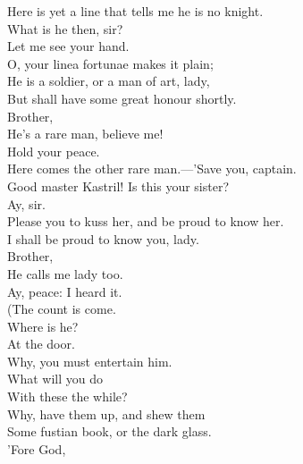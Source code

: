 \documentclass[a4paper,oneside,12pt]{memoir}
\begin{document}
\begin{drama*}
Here is yet a line that tells me he is no knight.\\
\pliantspeaks What is he then, sir?\\
\subtlespeaks {} Let me see your hand.\\
O, your linea fortunae makes it plain;\\
He is a soldier, or a man of art, lady,\\
But shall have some great honour shortly.\\
\pliantspeaks {} Brother,\\
He's a rare man, believe me!\\
\kastrilspeaks {} Hold your peace.\\
Here comes the other rare man.---'Save you, captain.\\
\facespeaks Good master Kastril! Is this your sister?\\
\kastrilspeaks {} Ay, sir.\\
Please you to kuss her, and be proud to know her.\\
\facespeaks I shall be proud to know you, lady.\\
\pliantspeaks {} Brother,\\
He calls me lady too.\\
\kastrilspeaks {} Ay, peace: I heard it.\\
\facespeaks (The count is come.\\
\subtlespeaks {} Where is he?\\
\facespeaks {} At the door.\\
\subtlespeaks Why, you must entertain him.\\
\facespeaks {} What will you do\\
With these the while?\\
\subtlespeaks {} Why, have them up, and shew them\\
Some fustian book, or the dark glass.\\
\facespeaks {} 'Fore God,\\

\end{drama*}
\end{document}
